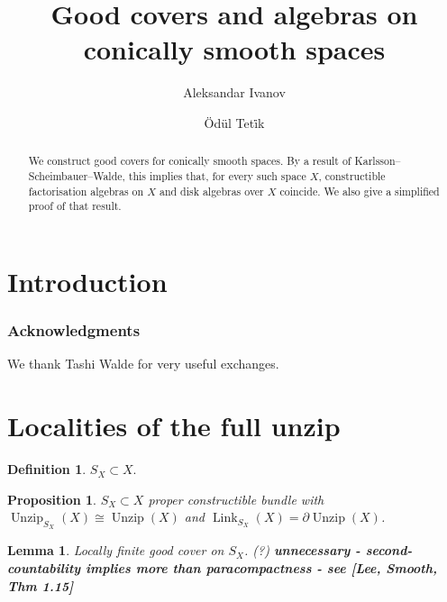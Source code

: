 \documentclass[11pt]{amsart}
\title{{Good covers and algebras on conically smooth spaces}}
\author{Aleksandar Ivanov}
\author{\"Od\"ul Tet\.{i}k}
\date{}
\DeclareMathOperator{\Unzip}{Unzip}
\DeclareMathOperator{\Link}{Link}
\numberwithin{equation}{section}
\theoremstyle{definition}
\newtheorem{definition}[equation]{Definition}%
\theoremstyle{remark}
\theoremstyle{plain}
\newtheorem{proposition}[equation]{Proposition}
\newtheorem{lemma}[equation]{Lemma}
\begin{document}
\maketitle

\begin{abstract}
    We construct good covers for conically smooth spaces. By a result of Karlsson--Scheimbauer--Walde, this implies that, for every such space $X$, constructible factorisation algebras on $X$ and disk algebras over $X$ coincide. We also give a simplified proof of that result.
\end{abstract}



\tableofcontents

\section{Introduction}

\subsubsection*{Acknowledgments} We thank Tashi Walde for very useful exchanges.

\section{Localities of the full unzip}


\begin{definition}
    $S_X\subset X$.
\end{definition}

\begin{proposition}\label{7GBVGBA}
    $S_X\subset X$ proper constructible bundle with $\Unzip_{S_X}(X)\cong\Unzip(X)$ and $\Link_{S_X}(X)=\partial\Unzip(X)$.
\end{proposition}


\begin{lemma}\label{DNFREG0}
    {\color{gray}Locally finite good cover on $S_X$. (?)} {\bf unnecessary - second-countability implies more than paracompactness - see [Lee, Smooth, Thm 1.15]}
\end{lemma}
\end{document}
